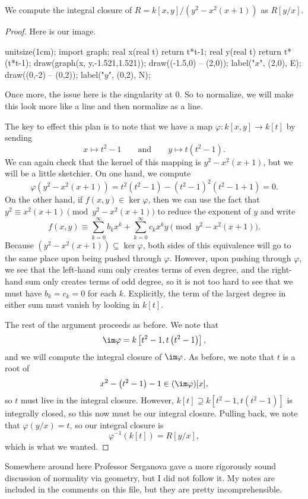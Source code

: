 \begin{exe}
	We compute the integral closure of $R=k[x,y]/\left(y^2-x^2(x+1)\right)$ as $R[y/x]$.
\end{exe}
\begin{proof}
	Here is our image.
	\begin{center}
		\begin{asy}
			unitsize(1cm);
			import graph;
			real x(real t)
			{
				return t*t-1;
			}
			real y(real t)
			{
				return t*(t*t-1);
			}
			draw(graph(x, y,-1.521,1.521));
			draw((-1.5,0) -- (2,0)); label("$x$", (2,0), E);
			draw((0,-2) -- (0,2)); label("$y$", (0,2), N);
		\end{asy}
	\end{center}
	Once more, the issue here is the singularity at $0$. So to normalize, we will make this look more like a line and then normalize as a line.

	The key to effect this plan is to note that we have a map $\varphi:k[x,y]\to k[t]$ by sending
	\[x\mapsto t^2-1\qquad\text{and}\qquad y\mapsto t\left(t^2-1\right).\]
	We can again check that the kernel of this mapping is $y^2-x^2(x+1)$, but we will be a little sketchier. On one hand, we compute
	\[\varphi\left(y^2-x^2(x+1)\right)=t^2\left(t^2-1\right)-\left(t^2-1\right)^2\left(t^2-1+1\right)=0.\]
	On the other hand, if $f(x,y)\in\ker\varphi$, then we can use the fact that $y^2\equiv x^2(x+1)\pmod{y^2-x^2(x+1)}$ to reduce the exponent of $y$ and write
	\[f(x,y)\equiv\sum_{k=0}^\infty b_kx^k+\sum_{k=0}^\infty c_kx^ky\pmod{y^2-x^2(x+1)}.\]
	Because $\left(y^2-x^2(x+1)\right)\subseteq\ker\varphi$, both sides of this equivalence will go to the same place upon being pushed through $\varphi$. However, upon pushing through $\varphi$, we see that the left-hand sum only creates terms of even degree, and the right-hand sum only creates terms of odd degree, so it is not too hard to see that we must have $b_k=c_k=0$ for each $k$. Explicitly, the term of the largest degree in either sum must vanish by looking in $k[t]$.

	The rest of the argument proceeds as before. We note that
	\[\im\varphi=k\left[t^2-1,t\left(t^2-1\right)\right],\]
	and we will compute the integral closure of $\im\varphi$. As before, we note that $t$ is a root of
	\[x^2-\left(t^2-1\right)-1\in(\im\varphi)[x],\]
	so $t$ must live in the integral closure. However, $k[t]\supseteq k\left[t^2-1,t\left(t^2-1\right)\right]$ is integrally closed, so this now must be our integral closure. Pulling back, we note that $\varphi(y/x)=t$, so our integral closure is
	\[\varphi^{-1}(k[t])=\boxed{R[y/x]},\]
	which is what we wanted.
\end{proof}
\begin{remark}[Nir]
	Somewhere around here Professor Serganova gave a more rigorously sound discussion of normality via geometry, but I did not follow it. My notes are included in the comments on this file, but they are pretty incomprehensible.
\end{remark}

